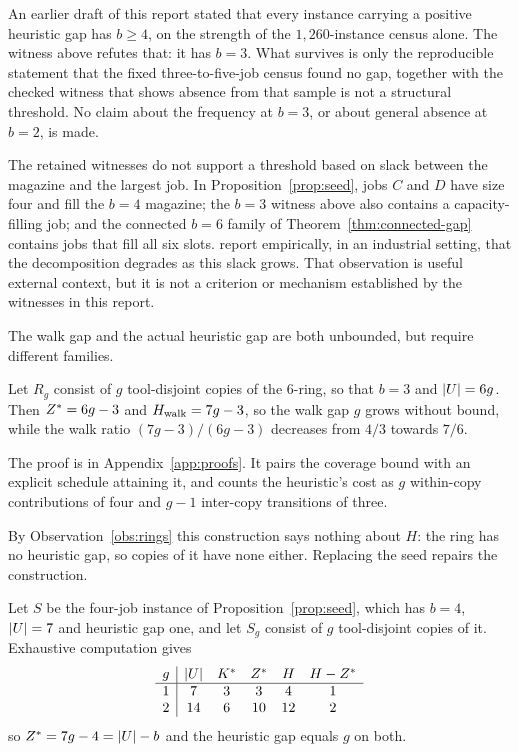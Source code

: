 \begin{remark}[A correction]\label{rem:census-b3}
An earlier draft of this report stated that every instance carrying a positive heuristic
gap has $b\ge4$, on the strength of the $1{,}260$-instance census alone. The witness
above refutes that: it has $b=3$. What survives is only the reproducible statement that
the fixed three-to-five-job census found no gap, together with the checked witness that
shows absence from that sample is not a structural threshold. No claim about the
frequency at $b=3$, or about general absence at $b=2$, is made.
\end{remark}

The retained witnesses do not support a threshold based on slack between the magazine
and the largest job. In Proposition~\ref{prop:seed}, jobs $C$ and $D$ have size four and
fill the $b=4$ magazine; the $b=3$ witness above also contains a capacity-filling job;
and the connected $b=6$ family of Theorem~\ref{thm:connected-gap} contains jobs that
fill all six slots. \citet{Burger2015} report empirically, in an industrial setting,
that the decomposition degrades as this slack grows. That observation is useful
external context, but it is not a criterion or mechanism established by the witnesses
in this report.

The walk gap and the actual heuristic gap are both unbounded, but require different
families.

\begin{proposition}\label{prop:unbounded}
Let $R_g$ consist of $g$ tool-disjoint copies of the $6$-ring, so that $b=3$ and
$\lvert U\rvert=6g$. Then $Z^{\ast}=6g-3$ and $H_{\mathrm{walk}}=7g-3$, so the walk gap $g$ grows
without bound, while the walk ratio $(7g-3)/(6g-3)$ decreases from $4/3$ towards
$7/6$.
\end{proposition}

The proof is in Appendix~\ref{app:proofs}. It pairs the coverage bound with an
explicit schedule attaining it, and counts the heuristic's cost as $g$ within-copy
contributions of four and $g-1$ inter-copy transitions of three.

By Observation~\ref{obs:rings} this construction says nothing about $H$: the ring has
no heuristic gap, so copies of it have none either. Replacing the seed repairs the
construction.

\begin{observation}\label{obs:copies}
Let $S$ be the four-job instance of Proposition~\ref{prop:seed}, which has $b=4$,
$\lvert U\rvert=7$ and heuristic gap one, and let $S_g$ consist of $g$ tool-disjoint
copies of it. Exhaustive computation gives
\[
  \begin{array}{c|ccccc}
   g & \lvert U\rvert & K^{\ast} & Z^{\ast} & H & H-Z^{\ast}\\\hline
   1 & 7  & 3 & 3  & 4  & 1\\
   2 & 14 & 6 & 10 & 12 & 2
  \end{array}
\]
so $Z^{\ast}=7g-4=\lvert U\rvert-b$ and the heuristic gap equals $g$ on both.
\end{observation}

